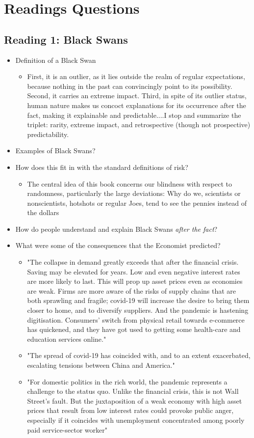 \documentclass[11pt]{article}
\theoremstyle{definition}
\begin{document}
\section{Readings Questions}
\subsection{Reading 1: Black Swans}
\begin{itemize}
\item Definition of a Black Swan
\begin{itemize}
\item First, it is an outlier, as it lies outside the realm of regular expectations, because nothing in the past can convincingly point to its possibility. Second, it carries an extreme impact. Third, in spite of its outlier status, human nature makes us concoct explanations for its occurrence after the fact, making it explainable and predictable....I stop and summarize the triplet: rarity, extreme impact, and retrospective (though not prospective) predictability. 
\end{itemize}
\item Examples of Black Swans?
\item How does this fit in with the standard definitions of risk?
\begin{itemize}
\item The central idea of this book concerns our blindness with respect to randomness, particularly the large deviations: Why do we, scientists or nonscientists, hotshots or regular Joes, tend to see the pennies instead of the dollars
\end{itemize}
\item How do people understand and explain Black Swans \textit{after the fact}?
\item What were some of the consequences that the Economist predicted?

\begin{itemize}
\item "The collapse in demand greatly exceeds that after the financial crisis. Saving may be elevated for years. Low and even negative interest rates are more likely to last. This will prop up asset prices even as economies are weak. Firms are more aware of the risks of supply chains that are both sprawling and fragile; covid-19 will increase the desire to bring them closer to home, and to diversify suppliers. And the pandemic is hastening digitisation. Consumers' switch from physical retail towards e-commerce has quickened, and they have got used to getting some health-care and education services online."
\item "The spread of covid-19 has coincided with, and to an extent exacerbated, escalating tensions between China and America."
\item "For domestic politics in the rich world, the pandemic represents a challenge to the status quo. Unlike the financial crisis, this is not Wall Street's fault. But the juxtaposition of a weak economy with high asset prices that result from low interest rates could provoke public anger, especially if it coincides with unemployment concentrated among poorly paid service-sector worker"
\end{itemize}


\end{itemize}
\end{document}
